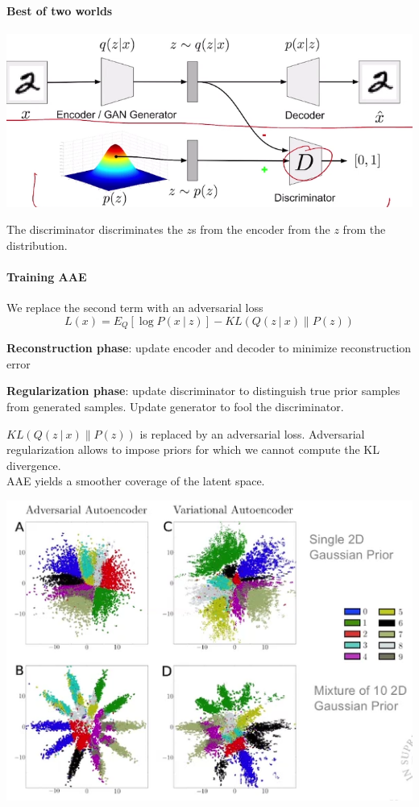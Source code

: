 \documentclass[10pt]{report}
\begin{document}
\paragraph{Best of two worlds}
\begin{center}
	\includegraphics[scale=0.5]{153.png}
\end{center}
The discriminator discriminates the $z$s from the encoder from the $z$ from the distribution.
\paragraph{Training AAE} We replace the second term with an adversarial loss
$$L(x) = E_Q[\log P(x\:|\:z)]-KL(Q(z\:|\:x)\|P(z))$$
\begin{list}{}{}
	\item \textbf{Reconstruction phase}: update encoder and decoder to minimize reconstruction error
	\item \textbf{Regularization phase}: update discriminator to distinguish true prior samples from generated samples. Update generator to fool the discriminator.
\end{list}
$KL(Q(z\:|\:x)\|P(z))$ is replaced by an adversarial loss. Adversarial regularization allows to impose priors for which we cannot compute the KL divergence.\\
AAE yields a smoother coverage of the latent space.
\begin{center}
	\includegraphics[scale=0.5]{154.png}
\end{center}
\end{document}
